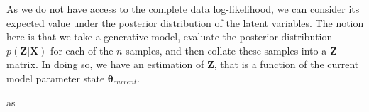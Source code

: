 \documentclass{article}
\begin{document}
As we do not have access to the complete data log-likelihood, we can consider its expected value under the posterior distribution of the latent variables. The notion here is that we take a generative model, evaluate the posterior distribution $p(\mathbf{Z}\vert\mathbf{X})$ for each of the $n$ samples, and then collate these samples into a $\mathbf{Z}$ matrix. In doing so, we have an estimation of $\mathbf{Z}$, that is a function of the current model parameter state $\boldsymbol\theta_{current}$. 

as 
\end{document}
